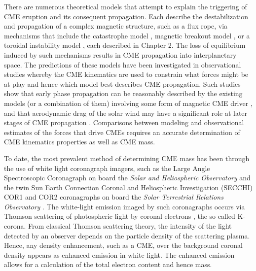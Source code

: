 There are numerous theoretical models that attempt to explain the triggering of CME eruption and its consequent propagation. Each describe the destabilization and propagation of a complex magnetic structure, such as a flux rope, via mechanisms that include the catastrophe model \citep{forbes1991,forbes1995,lin2000}, magnetic breakout model \citep{antio99,lynch2008}, or a toroidal instability model \citep{chen1996,kleim2006}, each described in Chapter 2. The loss of equilibrium induced by such mechanisms results in CME propagation into interplanetary space. The predictions of these models have been investigated in observational studies whereby the CME kinematics are used to constrain what forces might be at play and hence which model best describes CME propagation. Such studies show that early phase propagation can be reasonably described by the existing models (or a combination of them) involving some form of magnetic CME driver \citep{manoh2003, chen2006, schrijver2008c, lin2010}, and that aerodynamic drag of the solar wind may have a significant role at later stages of CME propagation \citep{howard2007, malo10, byrne2010}. Comparisons between modeling and observational estimates of the forces that drive CMEs requires an accurate determination of CME kinematics properties as well as CME mass.

To date, the most prevalent method of determining CME mass has been through the use of white light coronagraph imagers, such as the Large Angle Spectroscopic Coronagraph  \citep[LASCO;][]{bru95} on board the \emph{Solar and Heliospheric Observatory} \citep[\emph{SOHO};][]{dom95}  and the twin Sun Earth Connection Coronal and Heliospheric Investigation (SECCHI) COR1 and COR2 coronagraphs \citep{how08} on board the \emph{Solar Terrestrial Relations Observatory}  \citep[\emph{STEREO};][]{kai08}. The white-light emission imaged by such coronagraphs occurs via Thomson scattering of photospheric light by coronal electrons \citep{min30, vdeh50, bil66}, the so called K-corona.  From classical Thomson scattering theory, the intensity of the light detected by an observer depends on the particle density of the scattering plasma. Hence, any density enhancement, such as a CME, over the background coronal density appears as enhanced emission in white light. The enhanced emission allows for a calculation of the total electron content and hence mass. 

